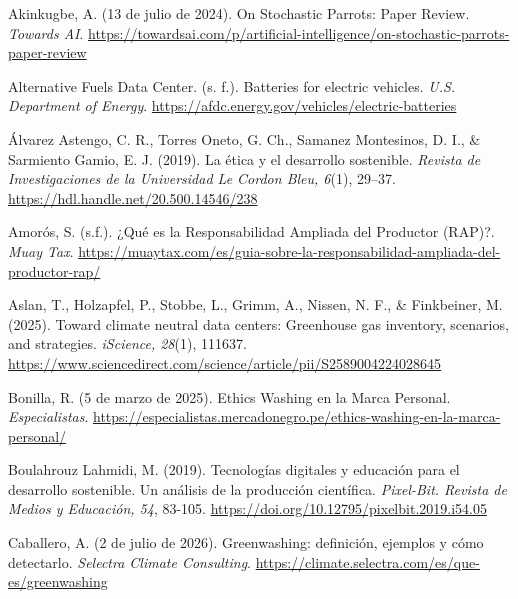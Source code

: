 \documentclass[stu,12pt,a4paper]{apa7}
\begin{document}
\begin{list}{}{
    \setlength{\leftmargin}{1.27cm}
    \setlength{\itemindent}{-1.27cm}  
    \setlength{\parsep}{0pt}       
    \setlength{\itemsep}{0.8em}      
}

\item Akinkugbe, A. (13 de julio de 2024). On Stochastic Parrots: Paper Review. \textit{Towards AI}. \url{https://towardsai.com/p/artificial-intelligence/on-stochastic-parrots-paper-review}

\item Alternative Fuels Data Center. (s. f.). Batteries for electric vehicles. \textit{U.S. Department of Energy}. \url{https://afdc.energy.gov/vehicles/electric-batteries}

\item Álvarez Astengo, C. R., Torres Oneto, G. Ch., Samanez Montesinos, D. I., \& Sarmiento Gamio, E. J. (2019). La ética y el desarrollo sostenible. \textit{Revista de Investigaciones de la Universidad Le Cordon Bleu, 6}(1), 29–37. \url{https://hdl.handle.net/20.500.14546/238}

\item Amorós, S. (s.f.). ¿Qué es la Responsabilidad Ampliada del Productor (RAP)?. \textit{Muay Tax}. \url{https://muaytax.com/es/guia-sobre-la-responsabilidad-ampliada-del-productor-rap/}

\item Aslan, T., Holzapfel, P., Stobbe, L., Grimm, A., Nissen, N. F., \& Finkbeiner, M. (2025). Toward climate neutral data centers: Greenhouse gas inventory, scenarios, and strategies. \textit{iScience, 28}(1), 111637. \url{https://www.sciencedirect.com/science/article/pii/S2589004224028645}

\item Bonilla, R. (5 de marzo de 2025). Ethics Washing en la Marca Personal. \textit{Especialistas}. \url{https://especialistas.mercadonegro.pe/ethics-washing-en-la-marca-personal/}

\item Boulahrouz Lahmidi, M. (2019). Tecnologías digitales y educación para el desarrollo sostenible. Un análisis de la producción científica. \textit{Pixel-Bit. Revista de Medios y Educación, 54}, 83-105. \url{https://doi.org/10.12795/pixelbit.2019.i54.05}

\item Caballero, A. (2 de julio de 2026). Greenwashing: definición, ejemplos y cómo detectarlo. \textit{Selectra Climate Consulting}. \url{https://climate.selectra.com/es/que-es/greenwashing}


\end{list}
\end{document}
